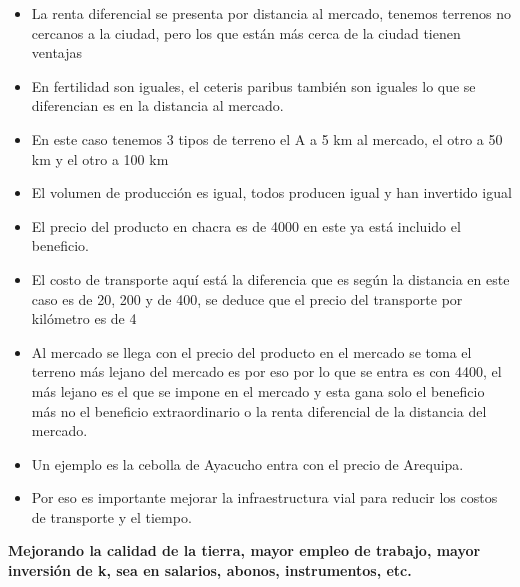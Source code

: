 \documentclass[
  letterpaper,
  DIV=11,
  numbers=noendperiod]{scrartcl}
\begin{document}
\begin{itemize}
\item
  La renta diferencial se presenta por distancia al mercado, tenemos
  terrenos no cercanos a la ciudad, pero los que están más cerca de la
  ciudad tienen ventajas
\item
  En fertilidad son iguales, el ceteris paribus también son iguales lo
  que se diferencian es en la distancia al mercado.
\item
  En este caso tenemos 3 tipos de terreno el A a 5 km al mercado, el
  otro a 50 km y el otro a 100 km
\item
  El volumen de producción es igual, todos producen igual y han
  invertido igual
\item
  El precio del producto en chacra es de 4000 en este ya está incluido
  el beneficio.
\item
  El costo de transporte aquí está la diferencia que es según la
  distancia en este caso es de 20, 200 y de 400, se deduce que el precio
  del transporte por kilómetro es de 4
\item
  Al mercado se llega con el precio del producto en el mercado se toma
  el terreno más lejano del mercado es por eso por lo que se entra es
  con 4400, el más lejano es el que se impone en el mercado y esta gana
  solo el beneficio más no el beneficio extraordinario o la renta
  diferencial de la distancia del mercado.
\item
  Un ejemplo es la cebolla de Ayacucho entra con el precio de Arequipa.
\item
  Por eso es importante mejorar la infraestructura vial para reducir los
  costos de transporte y el tiempo.
\end{itemize}

\textbf{Mejorando la calidad de la tierra, mayor empleo de trabajo,
mayor inversión de k, sea en salarios, abonos, instrumentos, etc.}
\end{document}
